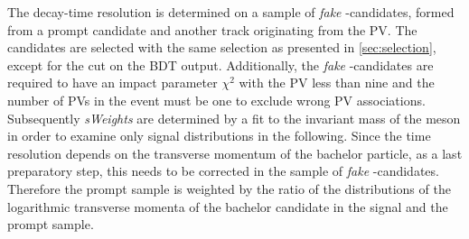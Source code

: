 The decay-time resolution is determined on a sample of \emph{fake} \Bz-candidates, formed from a prompt \Dpm candidate and another track originating from the PV.
The candidates are selected with the same selection as presented in \cref{sec:selection}, except for the cut on the BDT output.
Additionally, the \emph{fake} \Bz-candidates are required to have an impact parameter $\chi^2$ with the PV less than nine and the number of \ac{PV}s in the event must be one to exclude wrong \ac{PV} associations.
Subsequently \emph{sWeights} are determined by a fit to the invariant mass of the \Dpm meson in order to examine only signal distributions in the following.
Since the time resolution depends on the transverse momentum of the bachelor particle, as a last preparatory step, this needs to be corrected in the sample of \emph{fake} \Bz-candidates.
Therefore the prompt sample is weighted by the ratio of the distributions of the logarithmic transverse momenta of the bachelor candidate in the signal \BdToDpi and the prompt sample.

